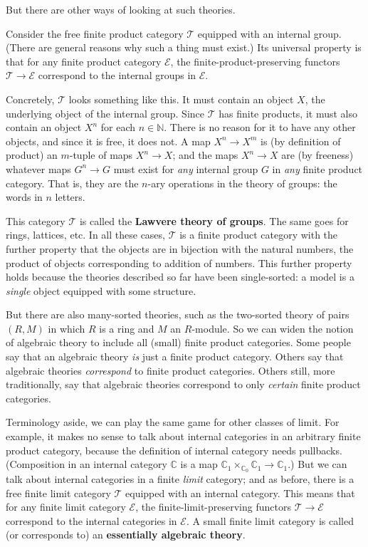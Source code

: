 \documentclass[12pt]{article}
\newcommand{\cat}[1]{\mathscr{#1}}
\newcommand{\demph}[1]{\textbf{\textup{#1}}}
\newcommand{\scat}[1]{\mathbb{#1}}
\newcommand{\nat}{\mathbb{N}}
\newcommand{\E}{\cat{E}}
\newcommand{\T}{\cat{T}}
\begin{document}
But there are other ways of looking at such theories.  

Consider the free finite product category $\T$ equipped with an internal
group.  (There are general reasons why such a thing must exist.)  Its
universal property is that for any finite product category $\E$, the
finite-product-preserving functors $\T \to \E$ correspond to the internal
groups in $\E$.

Concretely, $\T$ looks something like this.  It must contain an object $X$,
the underlying object of the internal group.  Since $\T$ has finite
products, it must also contain an object $X^n$ for each $n \in \nat$.  There
is no reason for it to have any other objects, and since it is free, it does
not.  A map $X^n \to X^m$ is (by definition of product) an $m$-tuple of maps
$X^n \to X$; and the maps $X^n \to X$ are (by freeness) whatever maps $G^n \to
G$ must exist for \emph{any} internal group $G$ in \emph{any} finite product
category.  That is, they are the $n$-ary operations in the theory of groups:
the words in $n$ letters.

This category $\T$ is called the \demph{Lawvere theory of groups}.  The same
goes for rings, lattices, etc.  In all these cases, $\T$ is a finite product
category with the further property that the objects are in bijection with the
natural numbers, the product of objects corresponding to addition of numbers.
This further property holds because the theories described so far have been
single-sorted: a model is a \emph{single} object equipped with some structure.

But there are also many-sorted theories, such as the two-sorted theory of
pairs $(R, M)$ in which $R$ is a ring and $M$ an $R$-module.  So we can widen
the notion of algebraic theory to include all (small) finite product
categories.  Some people say that an algebraic theory \emph{is} just a finite
product category.  Others say that algebraic theories \emph{correspond}
to finite product categories.  Others still, more traditionally, say that
algebraic theories correspond to only \emph{certain} finite product
categories.

Terminology aside, we can play the same game for other classes of limit.  For
example, it makes no sense to talk about internal categories in an arbitrary
finite product category, because the definition of internal category needs
pullbacks.  (Composition in an internal category $\scat{C}$ is a map
$\scat{C}_1 \times_{\scat{C}_0} \scat{C}_1 \to \scat{C}_1$.)  But we can talk
about internal categories in a finite \emph{limit} category; and as before,
there is a free finite limit category $\T$ equipped with an internal category.
This means that for any finite limit category $\E$, the
finite-limit-preserving functors $\T \to \E$ correspond to the internal
categories in $\E$.  A small finite limit category is called (or corresponds
to) an \demph{essentially algebraic theory}.
\end{document}

